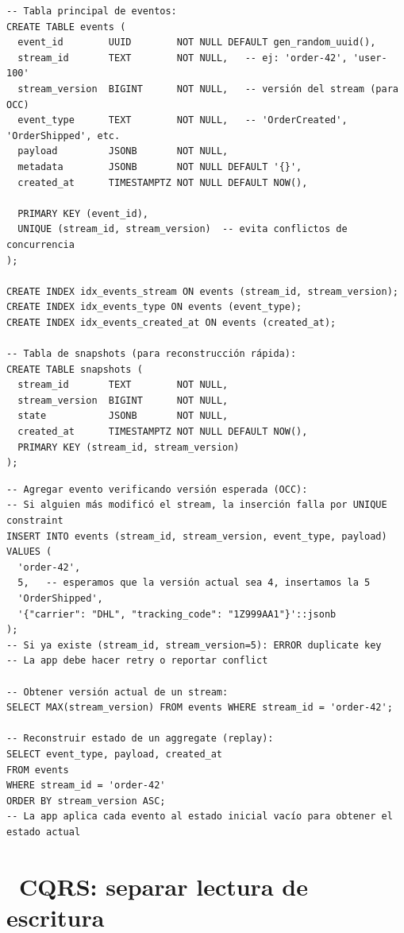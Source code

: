 \begin{lstlisting}[caption={Schema de Event Store}]
-- Tabla principal de eventos:
CREATE TABLE events (
  event_id        UUID        NOT NULL DEFAULT gen_random_uuid(),
  stream_id       TEXT        NOT NULL,   -- ej: 'order-42', 'user-100'
  stream_version  BIGINT      NOT NULL,   -- versión del stream (para OCC)
  event_type      TEXT        NOT NULL,   -- 'OrderCreated', 'OrderShipped', etc.
  payload         JSONB       NOT NULL,
  metadata        JSONB       NOT NULL DEFAULT '{}',
  created_at      TIMESTAMPTZ NOT NULL DEFAULT NOW(),

  PRIMARY KEY (event_id),
  UNIQUE (stream_id, stream_version)  -- evita conflictos de concurrencia
);

CREATE INDEX idx_events_stream ON events (stream_id, stream_version);
CREATE INDEX idx_events_type ON events (event_type);
CREATE INDEX idx_events_created_at ON events (created_at);

-- Tabla de snapshots (para reconstrucción rápida):
CREATE TABLE snapshots (
  stream_id       TEXT        NOT NULL,
  stream_version  BIGINT      NOT NULL,
  state           JSONB       NOT NULL,
  created_at      TIMESTAMPTZ NOT NULL DEFAULT NOW(),
  PRIMARY KEY (stream_id, stream_version)
);
\end{lstlisting}

\begin{lstlisting}[caption={Append de eventos con Optimistic Concurrency Control}]
-- Agregar evento verificando versión esperada (OCC):
-- Si alguien más modificó el stream, la inserción falla por UNIQUE constraint
INSERT INTO events (stream_id, stream_version, event_type, payload)
VALUES (
  'order-42',
  5,   -- esperamos que la versión actual sea 4, insertamos la 5
  'OrderShipped',
  '{"carrier": "DHL", "tracking_code": "1Z999AA1"}'::jsonb
);
-- Si ya existe (stream_id, stream_version=5): ERROR duplicate key
-- La app debe hacer retry o reportar conflict

-- Obtener versión actual de un stream:
SELECT MAX(stream_version) FROM events WHERE stream_id = 'order-42';

-- Reconstruir estado de un aggregate (replay):
SELECT event_type, payload, created_at
FROM events
WHERE stream_id = 'order-42'
ORDER BY stream_version ASC;
-- La app aplica cada evento al estado inicial vacío para obtener el estado actual
\end{lstlisting}

\section[CQRS: separar lectura de escritura]{~CQRS: separar lectura de escritura}

